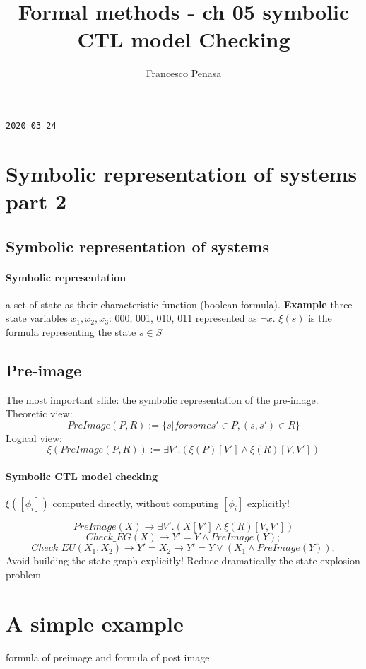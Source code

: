 \documentclass[11pt]{article}
\begin{document}
\author{Francesco Penasa}
\title{Formal methods - ch 05 symbolic CTL model Checking}
\maketitle

\medskip

\texttt{2020 03 24}
\section{Symbolic representation of systems part 2} %
\label{sec:symbolic_representation_of_systems_part_2}
\subsection{Symbolic representation of systems} %
\label{sub:symbolic_representation_of_systems}
\paragraph{Symbolic representation} %
\label{par:symbolic_representation}
a set of state as their characteristic function (boolean formula).
\textbf{Example} 
three state variables $x_1, x_2, x_3$: {000, 001, 010, 011} represented as $\lnot x$.
$\xi(s) $ is the formula representing the state $s \in S$

\subsection{Pre-image} %
\label{sub:pre_image}
The most important slide: the symbolic representation of the pre-image.\\
Theoretic view:
\[
	PreImage(P,R) :=  \{s | for some s' \in P, (s, s') \in R\}
\]
Logical view:
\[
	\xi(PreImage(P,R)) := \exists V' . (\xi(P)[V'] \land \xi(R)[V,V'])
\]


\paragraph{Symbolic CTL model checking} %
\label{par:symbolic_ctl_model_checking}
$\xi([\phi_i])$ computed directly, without computing 
$[\phi_i]$ explicitly!

$$PreImage(X) \rightarrow \exists V' . (X[V'] \land \xi(R)[V,V'])$$
$$Check\_EG(X) \rightarrow Y' = Y \land PreImage(Y);$$
	$$Check\_EU(X_1, X_2) \rightarrow Y'=X_2 \rightarrow Y' = Y \lor (X_1 \land PreImage(Y));$$
Avoid building the state graph explicitly! Reduce dramatically the state explosion problem 



\section{A simple example} %
\label{sec:a_simple_example}
 
formula of preimage and formula of post image
\end{document}
